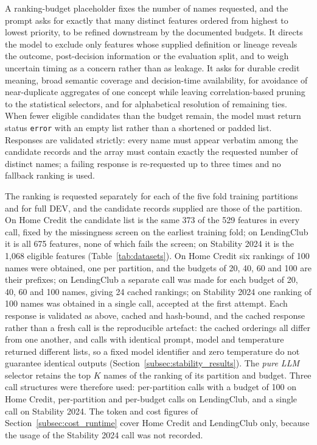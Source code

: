\documentclass[final,5p,twocolumn]{elsarticle}
\newcommand{\Kfeat}{K}
\begin{document}
A ranking-budget placeholder fixes the number of names requested, and the prompt asks for exactly that many distinct features ordered from highest to lowest priority, to be refined downstream by the documented budgets. It directs the model to exclude only features whose supplied definition or lineage reveals the outcome, post-decision information or the evaluation split, and to weigh uncertain timing as a concern rather than as leakage. It asks for durable credit meaning, broad semantic coverage and decision-time availability, for avoidance of near-duplicate aggregates of one concept while leaving correlation-based pruning to the statistical selectors, and for alphabetical resolution of remaining ties. When fewer eligible candidates than the budget remain, the model must return status \texttt{error} with an empty list rather than a shortened or padded list. Responses are validated strictly: every name must appear verbatim among the candidate records and the array must contain exactly the requested number of distinct names; a failing response is re-requested up to three times and no fallback ranking is used. 

The ranking is requested separately for each of the five fold training partitions and for full DEV, and the candidate records supplied are those of the partition. On Home Credit the candidate list is the same 373 of the 529 features in every call, fixed by the missingness screen on the earliest training fold; on LendingClub it is all 675 features, none of which fails the screen; on Stability 2024 it is the 1,068 eligible features (Table~\ref{tab:datasets}). On Home Credit six rankings of 100 names were obtained, one per partition, and the budgets of 20, 40, 60 and 100 are their prefixes; on LendingClub a separate call was made for each budget of 20, 40, 60 and 100 names, giving 24 cached rankings; on Stability 2024 one ranking of 100 names was obtained in a single call, accepted at the first attempt. Each response is validated as above, cached and hash-bound, and the cached response rather than a fresh call is the reproducible artefact: the cached orderings all differ from one another, and calls with identical prompt, model and temperature returned different lists, so a fixed model identifier and zero temperature do not guarantee identical outputs (Section~\ref{subsec:stability_results}). The \emph{pure LLM} selector retains the top $\Kfeat$ names of the ranking of its partition and budget. Three call structures were therefore used: per-partition calls with a budget of 100 on Home Credit, per-partition and per-budget calls on LendingClub, and a single call on Stability 2024. The token and cost figures of Section~\ref{subsec:cost_runtime} cover Home Credit and LendingClub only, because the usage of the Stability 2024 call was not recorded.
\end{document}
